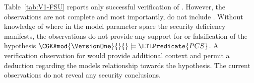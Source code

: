 Table\ \ref{tab:V1-FSU} reports only successful verification of .
However, the observations are not complete and most importantly, do not include .
Without knowledge of where in the  model parameter space the  security deficiency manifests, the observations do not provide any support for or falsification of the hypothesis \( \CGKAmod{\VersionOne}{}{} \models \LTLPredicate{PCS} \).
A verification observation for  would provide additional context and permit a deduction regarding the models relationship towards the hypothesis.
The current observations do not reveal any security conclusions.
